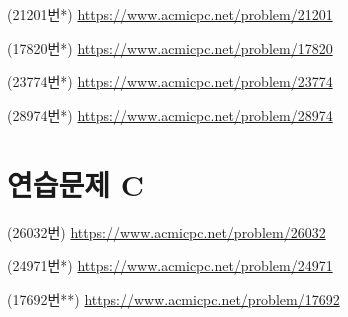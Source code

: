 \begin{problem}
    (21201번*) \url{https://www.acmicpc.net/problem/21201}
\end{problem}
\begin{problem}
    (17820번*) \url{https://www.acmicpc.net/problem/17820}
\end{problem}
\begin{problem}
    (23774번*) \url{https://www.acmicpc.net/problem/23774}
\end{problem}
\begin{problem}
    (28974번*) \url{https://www.acmicpc.net/problem/28974}
\end{problem}

\section{연습문제 C}
\begin{problem}
    (26032번) \url{https://www.acmicpc.net/problem/26032}
\end{problem}
\begin{problem}
    (24971번*) \url{https://www.acmicpc.net/problem/24971}
\end{problem}
\begin{problem}
    (17692번**) \url{https://www.acmicpc.net/problem/17692}
\end{problem}